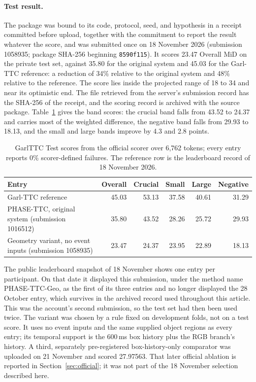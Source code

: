 \paragraph{Test result.} The package was bound to its code, protocol, seed, and hypothesis in a receipt committed before upload, together with the commitment to report the result whatever the score, and was submitted once on 18 November 2026 (submission 1058935; package SHA-256 beginning \texttt{8590f115}). It scores 23.47 Overall MiD on the private test set, against 35.80 for the original system and 45.03 for the Garl-TTC reference: a reduction of 34\% relative to the original system and 48\% relative to the reference. The score lies inside the projected range of 18 to 34 and near its optimistic end. The file retrieved from the server's submission record has the SHA-256 of the receipt, and the scoring record is archived with the source package. Table~\ref{tab:post-audit-test} gives the band scores: the crucial band falls from 43.52 to 24.37 and carries most of the weighted difference, the negative band falls from 29.93 to 18.13, and the small and large bands improve by 4.3 and 2.8 points.

\begin{table}[htbp]
\centering\small
\begin{tabular}{lrrrrr}
\toprule
Entry & Overall & Crucial & Small & Large & Negative \\
\midrule
Garl-TTC reference & 45.03 & 53.13 & 37.58 & 40.61 & 31.29 \\
PHASE-TTC, original system (submission 1016512) & 35.80 & 43.52 & 28.26 & 25.72 & 29.93 \\
Geometry variant, no event inputs (submission 1058935) & 23.47 & 24.37 & 23.95 & 22.89 & 18.13 \\
\bottomrule
\end{tabular}
\caption{GarlTTC Test scores from the official scorer over 6,762 tokens; every entry reports 0\% scorer-defined failures. The reference row is the leaderboard record of 18 November 2026.}
\label{tab:post-audit-test}
\end{table}

The public leaderboard snapshot of 18 November shows one entry per participant. On that date it displayed this submission, under the method name PHASE-TTC-Geo, as the first of its three entries and no longer displayed the 28 October entry, which survives in the archived record used throughout this article. This was the account's second submission, so the test set had then been used twice. The variant was chosen by a rule fixed on development folds, not on a test score. It uses no event inputs and the same supplied object regions as every entry; its temporal support is the 600\,ms box history plus the RGB branch's history. A third, separately pre-registered box-history-only comparator was uploaded on 21 November and scored 27.97563. That later official ablation is reported in Section~\ref{sec:official}; it was not part of the 18 November selection described here.

